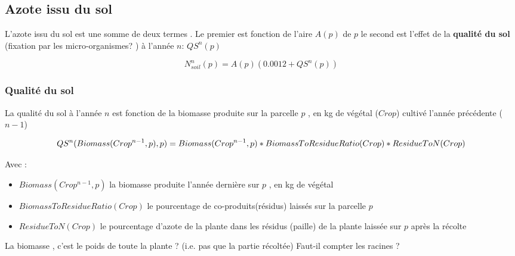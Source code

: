 \documentclass[10pt,a4paper,french]{article} %
\begin{document}
\subsection{Azote issu du sol}


L'azote issu du sol est une somme de deux termes . Le premier est fonction de l'aire $A(p)$ de $p$ le second est l'effet de la \textbf{qualité du sol} (fixation par les micro-organismes? ) à l'année $n$:  $QS^{n}(p)$

\begin{equation}
N_{soil}^{n}(p) = A(p)(0.0012 + QS^{n}(p))
\end{equation}



\subsubsection{Qualité du sol}

La qualité du sol à l'année $n$ est fonction de la biomasse produite sur la parcelle $p$ , en kg de végétal ($Crop$) cultivé l'année précédente ($n-1$)


\begin{equation}
QS^{n}(Biomass(Crop^{n-1},p),p) = Biomass(Crop^{n-1},p) * BiomassToResidueRatio(Crop) * ResidueToN(Crop)  \\
\end{equation}

Avec  :

\begin{itemize}
	\item $Biomass(Crop^{n-1},p)$  la biomasse produite l'année dernière sur $p$ , en kg de végétal
	\item $BiomassToResidueRatio(Crop)$ le pourcentage de co-produits(résidus) laissés sur la parcelle $p$ 
	\item $ResidueToN(Crop)$  le pourcentage d'azote de la plante dans les résidus (paille) de la plante laissée sur  $p$ après la récolte
\end{itemize}



\begin{tcolorbox}[noparskip,
    colback=LightGreen,colframe=DarkGreen,%
    colbacklower=LimeGreen!75!LightGreen,%
    title=Question]
La biomasse , c'est le poids de toute la plante ? (i.e. pas que la partie  récoltée)
Faut-il compter les racines ? 
\end{tcolorbox}
\end{document}

